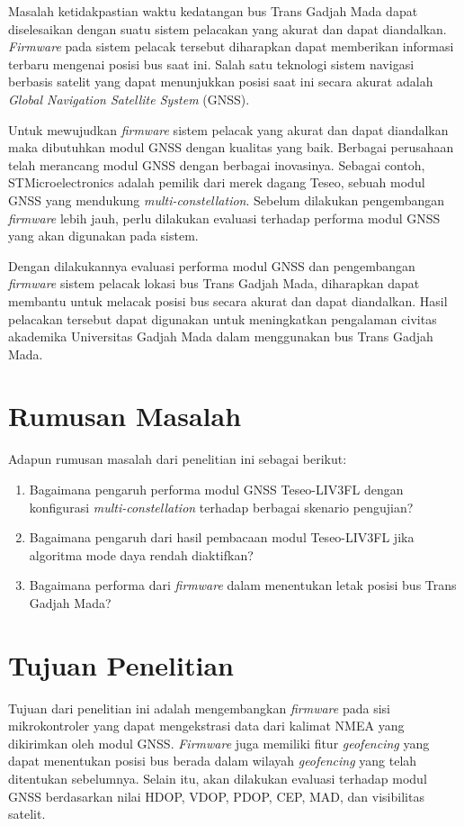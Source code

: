 Masalah ketidakpastian waktu kedatangan bus Trans Gadjah Mada dapat diselesaikan dengan suatu sistem pelacakan yang akurat dan dapat diandalkan. \textit{Firmware} pada sistem pelacak tersebut diharapkan dapat memberikan informasi terbaru mengenai posisi bus saat ini. Salah satu teknologi sistem navigasi berbasis satelit yang dapat menunjukkan posisi saat ini secara akurat adalah \textit{Global Navigation Satellite System} (GNSS).

Untuk mewujudkan \textit{firmware} sistem pelacak yang akurat dan dapat diandalkan maka dibutuhkan modul GNSS dengan kualitas yang baik. Berbagai perusahaan telah merancang modul GNSS dengan berbagai inovasinya. Sebagai contoh, STMicroelectronics adalah pemilik dari merek dagang Teseo, sebuah modul GNSS yang mendukung \textit{multi-constellation}. Sebelum dilakukan pengembangan \textit{firmware} lebih jauh, perlu dilakukan evaluasi terhadap performa modul GNSS yang akan digunakan pada sistem.

Dengan dilakukannya evaluasi performa modul GNSS dan pengembangan \textit{firmware} sistem pelacak lokasi bus Trans Gadjah Mada, diharapkan dapat membantu untuk melacak posisi bus secara akurat dan dapat diandalkan. Hasil pelacakan tersebut dapat digunakan untuk meningkatkan pengalaman civitas akademika Universitas Gadjah Mada dalam menggunakan bus Trans Gadjah Mada.

\section{Rumusan Masalah}
Adapun rumusan masalah dari penelitian ini sebagai berikut:
\begin{enumerate}
	\item Bagaimana pengaruh performa modul GNSS Teseo\hyp{}LIV3FL dengan konfigurasi \textit{multi-constellation} terhadap berbagai skenario pengujian?
	\item Bagaimana pengaruh dari hasil pembacaan modul Teseo\hyp{}LIV3FL jika algoritma mode daya rendah diaktifkan?
	\item Bagaimana performa dari \textit{firmware} dalam menentukan letak posisi bus Trans Gadjah Mada?
\end{enumerate}

\section{Tujuan Penelitian}
Tujuan dari penelitian ini adalah mengembangkan \textit{firmware} pada sisi mikrokontroler yang dapat mengekstrasi data dari kalimat NMEA yang dikirimkan oleh modul GNSS. \textit{Firmware} juga memiliki fitur \textit{geofencing} yang dapat menentukan posisi bus berada dalam wilayah \textit{geofencing} yang telah ditentukan sebelumnya. Selain itu, akan dilakukan evaluasi terhadap modul GNSS berdasarkan nilai HDOP, VDOP, PDOP, CEP, MAD, dan visibilitas satelit.

